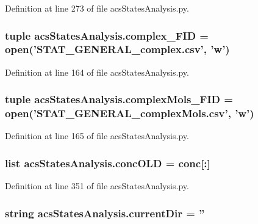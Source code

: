 Definition at line 273 of file acs\-States\-Analysis.\-py.

\hypertarget{a00098_ace41560d233dff88c3073be734bae944}{
\subsubsection[{complex\-\_\-\-F\-I\-D}]{\setlength{\rightskip}{0pt plus 5cm}tuple acs\-States\-Analysis.\-complex\-\_\-\-F\-I\-D = open('S\-T\-A\-T\-\_\-\-G\-E\-N\-E\-R\-A\-L\-\_\-complex.\-csv', 'w')}}\label{a00098_ace41560d233dff88c3073be734bae944}


Definition at line 164 of file acs\-States\-Analysis.\-py.

\hypertarget{a00098_a2ef28958c50aabe7867b32f8dd6f4ace}{
\subsubsection[{complex\-Mols\-\_\-\-F\-I\-D}]{\setlength{\rightskip}{0pt plus 5cm}tuple acs\-States\-Analysis.\-complex\-Mols\-\_\-\-F\-I\-D = open('S\-T\-A\-T\-\_\-\-G\-E\-N\-E\-R\-A\-L\-\_\-complex\-Mols.\-csv', 'w')}}\label{a00098_a2ef28958c50aabe7867b32f8dd6f4ace}


Definition at line 165 of file acs\-States\-Analysis.\-py.

\hypertarget{a00098_a15f99c617a2dc95e52f741ee99e71b7a}{
\subsubsection[{conc\-O\-L\-D}]{\setlength{\rightskip}{0pt plus 5cm}list acs\-States\-Analysis.\-conc\-O\-L\-D = {\bf conc}\mbox{[}\-:\mbox{]}}}\label{a00098_a15f99c617a2dc95e52f741ee99e71b7a}


Definition at line 351 of file acs\-States\-Analysis.\-py.

\hypertarget{a00098_ae98225d5c8c20399f5c3b888fa37746f}{
\subsubsection[{current\-Dir}]{\setlength{\rightskip}{0pt plus 5cm}string acs\-States\-Analysis.\-current\-Dir = ''}}\label{a00098_ae98225d5c8c20399f5c3b888fa37746f}


